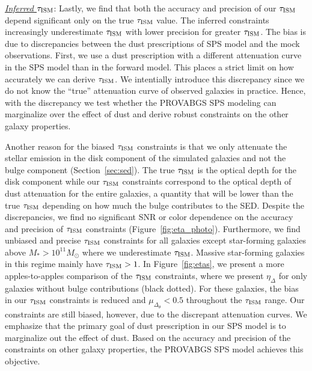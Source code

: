 \noindent \underline{\emph{Inferred $\tau_{\rm ISM}$}}:  
Lastly, we find that both the accuracy and precision of our $\tau_{\rm ISM}$ depend
significant only on the true $\tau_{\rm ISM}$ value. 
The inferred constraints increasingly underestimate $\tau_{\rm ISM}$ with lower
precision for greater $\tau_{\rm ISM}$.
The bias is due to discrepancies between the dust prescriptions of SPS model
and the mock observations. 
First, we use a dust prescription with a different attenuation curve in the SPS
model than in the forward model. 
This places a strict limit on how accurately we can derive $\tau_{\rm ISM}$.
We intentially introduce this discrepancy since we do not know the ``true''
attenuation curve of observed galaxies in practice. 
Hence, with the discrepancy we test whether the {\sc PROVABGS} SPS modeling can
marginalize over the effect of dust and derive robust constraints on the other
galaxy properties.

Another reason for the biased $\tau_{\rm ISM}$ constraints is that we only attenuate
the stellar emission in the disk component of the simulated galaxies and not
the bulge component (Section~\ref{sec:sed}).
The true $\tau_{\rm ISM}$ is the optical depth for the disk component while our
$\tau_{\rm ISM}$ constraints correspond to the optical depth of dust attenuation
for the entire galaxies, a quantity that will be lower than the true $\tau_{\rm ISM}$
depending on how much the bulge contributes to the SED. 
Despite the discrepancies, we find no significant SNR or color dependence on
the accuracy and precision of $\tau_{\rm ISM}$ constraints
(Figure~\ref{fig:eta_photo}). 
Furthermore, we find unbiased and precise $\tau_{\rm ISM}$ constraints for all galaxies
except star-forming galaxies above $M_* > 10^{11}M_\odot$ where we underestimate 
$\tau_{\rm ISM}$. 
Massive star-forming galaxies in this regime mainly have $\tau_{\rm ISM} > 1$.
In Figure~\ref{fig:etas}, we present a more apples-to-apples comparison of the
$\tau_{\rm ISM}$ constraints, where we present $\eta_\Delta$ for only galaxies without
bulge contributions (black dotted). 
For these galaxies, the bias in our $\tau_{\rm ISM}$ constraints is reduced and
$\mu_{\Delta_\theta}<0.5$ throughout the $\tau_{\rm ISM}$ range. 
Our constraints are still biased, however, due to the discrepant attenuation
curves. 
We emphasize that the primary goal of dust prescription in our SPS model is to
marginalize out the effect of dust. 
Based on the accuracy and precision of the constraints on other galaxy
properties, the {\sc PROVABGS} SPS model achieves this objective.  



